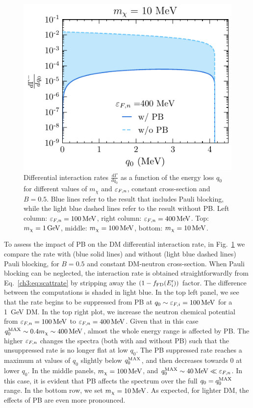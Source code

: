\begin{figure}[t!bp]
    \includegraphics[width=.45\textwidth]{capture_1/diff_intrate_n0_mu_400MeV_mdm10MeV.pdf}
    \caption{Differential interaction rates $\frac{d\Gamma}{dq_0}$  
    as a function of the energy loss $q_0$ for different values of $m_\chi$ and $\varepsilon_{F,n}$, constant cross-section and $B=0.5$. Blue lines refer to the result that includes Pauli blocking, while the light blue dashed lines refer to the result without PB. Left column:  $\varepsilon_{F,n}=100{\rm \,MeV}$, right column: $\varepsilon_{F,n}=400{\rm \,MeV}$. Top: $m_\chi=1{\rm \,GeV}$, middle: $m_\chi=100{\rm \,MeV}$, bottom: $m_\chi=10{\rm \,MeV}$.  }
    \label{ch3:fig:gammaNPBmu}
\end{figure}




To assess the impact of PB on the DM differential interaction rate, in Fig.~\ref{ch3:fig:gammaNPBmu} we compare the rate 
with (blue solid lines) and without (light blue dashed lines) Pauli blocking, for $B=0.5$ and constant DM-neutron cross-section. When Pauli blocking can be neglected, the interaction rate is obtained straightforwardly from Eq.~\ref{ch3:eq:scattrate} by stripping away the $(1 - f_{\rm FD}(E_i'))$ factor. 
The difference between the computations is shaded in light blue. In the top left panel, we see that the rate begins to be suppressed from PB at $q_0 \sim \varepsilon_{F,i} = 100{\rm \,MeV}$ for a 1~GeV DM.
In the top right plot, we increase the neutron chemical potential from $\varepsilon_{F,n}=100{\rm \,MeV}$ to $\varepsilon_{F,n}=400{\rm \,MeV}$. Given that in this case $q_0^{\rm MAX} \sim 0.4 m_\chi \sim 400{\rm \,MeV}$, almost the whole energy range is affected by PB. The higher $\varepsilon_{F,n}$ changes the spectra (both with and without PB) such that the unsuppressed rate is no longer flat at low $q_0$. The PB suppressed rate reaches a maximum at values of $q_0$ slightly below $q_0^{\rm MAX}$, and then decreases towards $0$ at lower $q_0$.
In the middle panels, $m_\chi=100{\rm \,MeV}$, and $q_0^{\rm MAX}\sim40{\rm \,MeV}\ll\varepsilon_{F,n}$. In this case, it is evident that PB affects the spectrum over the full $q_0=q_0^{\rm MAX}$ range. In the bottom row, we set $m_\chi=10{\rm \,MeV}$. As expected, for lighter DM,  the effects of PB are even more pronounced.




